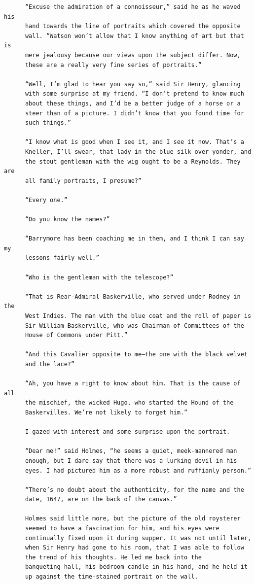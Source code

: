 \documentclass{article}
\begin{document}
\begin{verbatim}
      “Excuse the admiration of a connoisseur,” said he as he waved his
      hand towards the line of portraits which covered the opposite
      wall. “Watson won’t allow that I know anything of art but that is
      mere jealousy because our views upon the subject differ. Now,
      these are a really very fine series of portraits.”

      “Well, I’m glad to hear you say so,” said Sir Henry, glancing
      with some surprise at my friend. “I don’t pretend to know much
      about these things, and I’d be a better judge of a horse or a
      steer than of a picture. I didn’t know that you found time for
      such things.”

      “I know what is good when I see it, and I see it now. That’s a
      Kneller, I’ll swear, that lady in the blue silk over yonder, and
      the stout gentleman with the wig ought to be a Reynolds. They are
      all family portraits, I presume?”

      “Every one.”

      “Do you know the names?”

      “Barrymore has been coaching me in them, and I think I can say my
      lessons fairly well.”

      “Who is the gentleman with the telescope?”

      “That is Rear-Admiral Baskerville, who served under Rodney in the
      West Indies. The man with the blue coat and the roll of paper is
      Sir William Baskerville, who was Chairman of Committees of the
      House of Commons under Pitt.”

      “And this Cavalier opposite to me—the one with the black velvet
      and the lace?”

      “Ah, you have a right to know about him. That is the cause of all
      the mischief, the wicked Hugo, who started the Hound of the
      Baskervilles. We’re not likely to forget him.”

      I gazed with interest and some surprise upon the portrait.

      “Dear me!” said Holmes, “he seems a quiet, meek-mannered man
      enough, but I dare say that there was a lurking devil in his
      eyes. I had pictured him as a more robust and ruffianly person.”

      “There’s no doubt about the authenticity, for the name and the
      date, 1647, are on the back of the canvas.”

      Holmes said little more, but the picture of the old roysterer
      seemed to have a fascination for him, and his eyes were
      continually fixed upon it during supper. It was not until later,
      when Sir Henry had gone to his room, that I was able to follow
      the trend of his thoughts. He led me back into the
      banqueting-hall, his bedroom candle in his hand, and he held it
      up against the time-stained portrait on the wall.


\end{verbatim}
\end{document}
